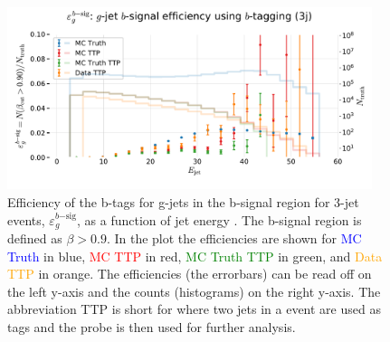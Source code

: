 \begin{figure}
  \includegraphics[width=0.95\textwidth, trim=0 0 0 30, clip]{figures/quarks/eff_g_bsig-down_sample=1.00-ML_vars=vertex-selection=b-ejet_min=4-n_iter_RS_lgb=99-n_iter_RS_xgb=9-cdot_cut=0.90-version=19.pdf}
  \caption[b-Tagging Efficiency $\varepsilon_g^{b\mathrm{-sig}}$ as a function of jet energy]
          {Efficiency of the b-tags for g-jets in the b-signal region for 3-jet events, $\varepsilon_g^{b\mathrm{-sig}}$, as a function of jet energy . The b-signal region is defined as $\beta > 0.9$. In the plot the efficiencies are shown for \textcolor{blue}{MC Truth} in blue, \textcolor{red}{MC TTP} in red, \textcolor{green}{MC Truth TTP} in green, and \textcolor{orange}{Data TTP} in orange. The efficiencies (the errorbars) can be read off on the left y-axis and the counts (histograms) on the right y-axis. The abbreviation TTP is short for  where two jets in a event are used as tags and the probe is then used for further analysis.  
          } 
  \label{fig:q:effiency_btag_gjet_bsig}
\end{figure}


